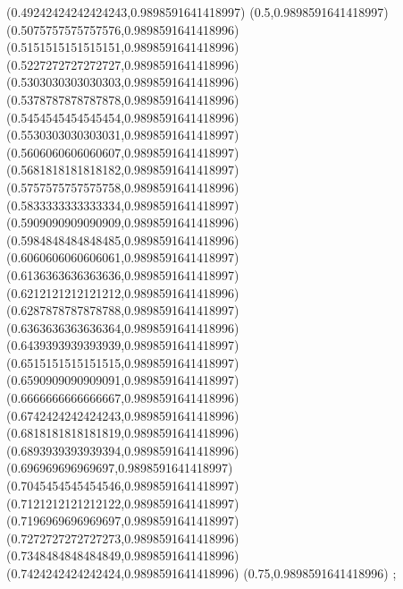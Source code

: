 {(0.49242424242424243,0.9898591641418997)
(0.5,0.9898591641418997)
(0.5075757575757576,0.9898591641418996)
(0.5151515151515151,0.9898591641418996)
(0.5227272727272727,0.9898591641418996)
(0.5303030303030303,0.9898591641418996)
(0.5378787878787878,0.9898591641418996)
(0.5454545454545454,0.9898591641418996)
(0.5530303030303031,0.9898591641418997)
(0.5606060606060607,0.9898591641418997)
(0.5681818181818182,0.9898591641418997)
(0.5757575757575758,0.9898591641418996)
(0.5833333333333334,0.9898591641418997)
(0.5909090909090909,0.9898591641418996)
(0.5984848484848485,0.9898591641418996)
(0.6060606060606061,0.9898591641418997)
(0.6136363636363636,0.9898591641418997)
(0.6212121212121212,0.9898591641418996)
(0.6287878787878788,0.9898591641418997)
(0.6363636363636364,0.9898591641418996)
(0.6439393939393939,0.9898591641418997)
(0.6515151515151515,0.9898591641418997)
(0.6590909090909091,0.9898591641418997)
(0.6666666666666667,0.9898591641418996)
(0.6742424242424243,0.9898591641418996)
(0.6818181818181819,0.9898591641418996)
(0.6893939393939394,0.9898591641418996)
(0.696969696969697,0.9898591641418997)
(0.7045454545454546,0.9898591641418997)
(0.7121212121212122,0.9898591641418997)
(0.7196969696969697,0.9898591641418997)
(0.7272727272727273,0.9898591641418996)
(0.7348484848484849,0.9898591641418996)
(0.7424242424242424,0.9898591641418996)
(0.75,0.9898591641418996)
};
